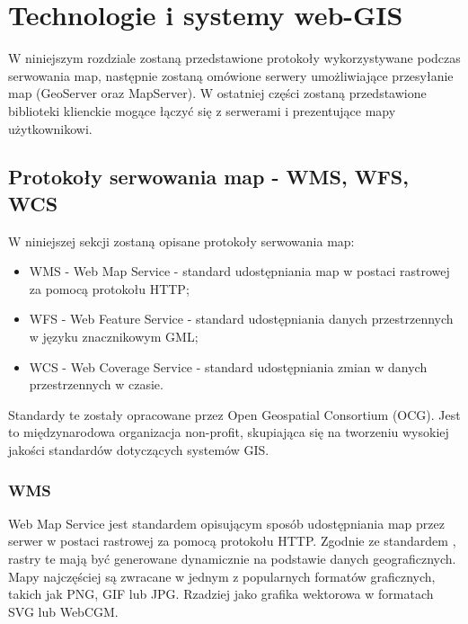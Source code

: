\chapter{Technologie i systemy web-GIS}
W niniejszym rozdziale zostaną przedstawione protokoły wykorzystywane podczas serwowania map, następnie zostaną omówione serwery umożliwiające przesyłanie map (GeoServer oraz MapServer).
W ostatniej części zostaną przedstawione biblioteki klienckie mogące łączyć się z serwerami i prezentujące mapy użytkownikowi.

\section{Protokoły serwowania map - WMS, WFS, WCS}
W niniejszej sekcji zostaną opisane protokoły serwowania map:
\begin{itemize}
\item WMS - Web Map Service - standard udostępniania map w postaci rastrowej za pomocą protokołu HTTP;
\item WFS - Web Feature Service - standard udostępniania danych przestrzennych w języku znacznikowym GML;
\item WCS - Web Coverage Service - standard udostępniania zmian w danych przestrzennych w czasie.
\end{itemize}

Standardy te zostały opracowane przez Open Geospatial Consortium (OCG). Jest to międzynarodowa organizacja non-profit, skupiająca się na tworzeniu wysokiej jakości standardów dotyczących systemów GIS.

\subsection{WMS}
Web Map Service jest standardem opisującym sposób udostępniania map przez serwer w postaci rastrowej za pomocą protokołu HTTP.
Zgodnie ze standardem \cite{OpenGIS_WMS2006}, rastry te mają być generowane dynamicznie na podstawie danych geograficznych.
Mapy najczęściej są zwracane w jednym z popularnych formatów graficznych, takich jak PNG, GIF lub JPG. Rzadziej jako grafika wektorowa w formatach SVG lub WebCGM.

